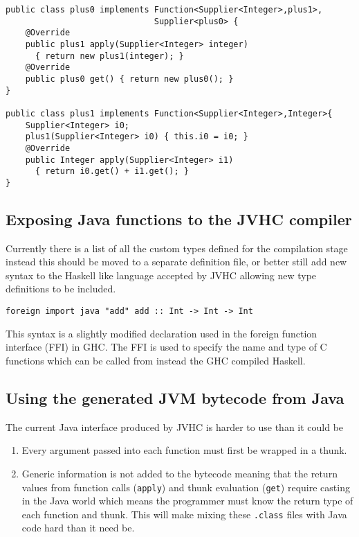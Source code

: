 \documentclass[float=false, crop=false]{standalone}
\begin{document}
\begin{verbatim}
public class plus0 implements Function<Supplier<Integer>,plus1>, 
                              Supplier<plus0> {
    @Override
    public plus1 apply(Supplier<Integer> integer) 
      { return new plus1(integer); }
    @Override
    public plus0 get() { return new plus0(); }
}

public class plus1 implements Function<Supplier<Integer>,Integer>{
    Supplier<Integer> i0;
    plus1(Supplier<Integer> i0) { this.i0 = i0; }
    @Override
    public Integer apply(Supplier<Integer> i1) 
      { return i0.get() + i1.get(); }
}
\end{verbatim}

\subsection{Exposing Java functions to the JVHC compiler}

Currently there is a list of all the custom types defined for the compilation stage
instead this should be moved to a separate definition file, or better still 
add new syntax to the Haskell like language accepted by JVHC allowing new type
definitions to be included.

\begin{verbatim}
foreign import java "add" add :: Int -> Int -> Int
\end{verbatim}

This syntax is a slightly modified declaration used in the foreign function interface (FFI) \cite{ghc_ffi} 
in GHC. The FFI is used to specify the name and type of C functions which can be called from 
instead the GHC compiled Haskell.

\subsection{Using the generated JVM bytecode from Java}

The current Java interface produced by JVHC is harder to use than it could be
\begin{enumerate}
  \item Every argument passed into each function must first be wrapped in a thunk. 
  \item Generic information is not added to the bytecode meaning that
the return values from function calls (\texttt{apply}) and thunk evaluation (\texttt{get}) require casting in the Java world which means the programmer
must know the return type of each function and thunk. This will
make mixing these \verb|.class| files with Java
code hard than it need be.
\end{enumerate}
\end{document}
